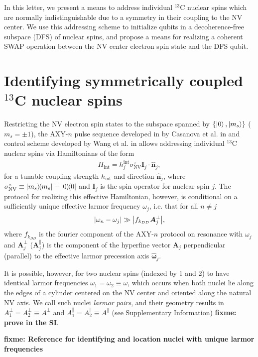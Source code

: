 \documentclass[twocolumn]{revtex4-1}
\renewcommand{\t}{\text} %
\renewcommand{\set}[1]{\left\{#1\right\}} %
\renewcommand{\v}{\bm} %
\newcommand{\uv}[1]{\hat{\v{#1}}} %
\renewcommand{\c}{\cdot} %
\newcommand{\NV}{\t{NV}}
\newcommand{\fixme}[1]{{\bf \color{red} fixme: #1}}
\begin{document}
In this letter, we present a means to address individual $^{13}$C
nuclear spins which are normally indistinguishable due to a symmetry
in their coupling to the NV center. We use this addressing scheme to
initialize qubits in a decoherence-free subspace (DFS) of nuclear
spins, and propose a means for realizing a coherent SWAP operation
between the NV center electron spin state and the DFS qubit.

\section{Identifying symmetrically coupled $^{13}$C nuclear spins}

Restricting the NV electron spin states to the subspace spanned by
$\set{\ket0,\ket{m_s}}$ ($m_s=\pm1$), the AXY-$n$ pulse sequence
developed in by Casanova et al. in \cite{casanova2015robust} and
control scheme developed by Wang et al. in \cite{wang2016positioning}
allows addressing individual $^{13}$C nuclear spins via Hamiltonians
of the form
\begin{align}
  H_\t{int} = h_j^\t{int}\sigma_\NV^z\v I_j\c\uv n_j,
  \label{H_int}
\end{align}
for a tunable coupling strength $h_\t{int}$ and direction $\uv n_j$,
where $\sigma_\NV^z\equiv\op{m_s}-\op{0}$ and $\v I_j$ is the spin
operator for nuclear spin $j$. The protocol for realizing this
effective Hamiltonian, however, is conditional on a sufficiently
unique effective larmor frequency $\omega_j$, i.e. that for all
$n\ne j$
\begin{align}
  \abs{\omega_n-\omega_j} \gg \abs{f_{k_{DD}}\v A_j^\perp},
\end{align}
where $f_{k_{DD}}$ is the fourier component of the AXY-$n$ protocol on
resonance with $\omega_j$ and $\v A_j^\perp$ ($\v A_j^\parallel$) is
the component of the hyperfine vector $\v A_j$ perpendicular
(parallel) to the effective larmor precession axis $\uv\omega_j$.

It is possible, however, for two nuclear spins (indexed by 1 and 2) to
have identical larmor frequencies $\omega_1=\omega_2\equiv\omega$,
which occurs when both nuclei lie along the edges of a cylinder
centered on the NV center and oriented along the natural NV axis. We
call such nuclei {\it larmor pairs}, and their geometry results in
$A_1^\perp=A_2^\perp\equiv A^\perp$ and
$A_1^\parallel=A_2^\parallel\equiv A^\parallel$ (see Supplementary
Information) \fixme{prove in the SI}.

\fixme{Reference \cite{wang2016positioning} for identifying and
  location nuclei with unique larmor frequencies}
\end{document}
